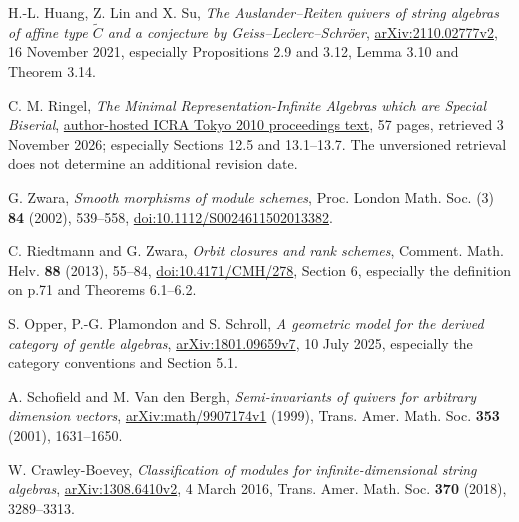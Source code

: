 H.-L. Huang, Z. Lin and X. Su,
\emph{The Auslander--Reiten quivers of string algebras of affine type
$\widetilde C$ and a conjecture by Geiss--Leclerc--Schr\"oer},
\href{https://arxiv.org/abs/2110.02777v2}{arXiv:2110.02777v2},
16 November 2021, especially Propositions 2.9 and 3.12, Lemma 3.10 and Theorem 3.14.

C. M. Ringel, \emph{The Minimal Representation-Infinite Algebras which are Special Biserial},
\href{https://www.math.uni-bielefeld.de/~ringel/opus/tokyo.pdf}{author-hosted ICRA Tokyo 2010 proceedings text},
57 pages, retrieved 3 November 2026; especially Sections 12.5 and 13.1--13.7.
The unversioned retrieval does not determine an additional revision date.

G. Zwara, \emph{Smooth morphisms of module schemes},
Proc. London Math. Soc. (3) \textbf{84} (2002), 539--558,
\href{https://doi.org/10.1112/S0024611502013382}{doi:10.1112/S0024611502013382}.

C. Riedtmann and G. Zwara, \emph{Orbit closures and rank schemes},
Comment. Math. Helv. \textbf{88} (2013), 55--84,
\href{https://doi.org/10.4171/CMH/278}{doi:10.4171/CMH/278},
Section 6, especially the definition on p.71 and Theorems 6.1--6.2.

S. Opper, P.-G. Plamondon and S. Schroll,
\emph{A geometric model for the derived category of gentle algebras},
\href{https://arxiv.org/abs/1801.09659v7}{arXiv:1801.09659v7},
10 July 2025, especially the category conventions and Section 5.1.

A. Schofield and M. Van den Bergh,
\emph{Semi-invariants of quivers for arbitrary dimension vectors},
\href{https://arxiv.org/abs/math/9907174v1}{arXiv:math/9907174v1} (1999),
Trans. Amer. Math. Soc. \textbf{353} (2001), 1631--1650.

W. Crawley-Boevey, \emph{Classification of modules for infinite-dimensional string algebras},
\href{https://arxiv.org/abs/1308.6410v2}{arXiv:1308.6410v2}, 4 March 2016,
Trans. Amer. Math. Soc. \textbf{370} (2018), 3289--3313.
